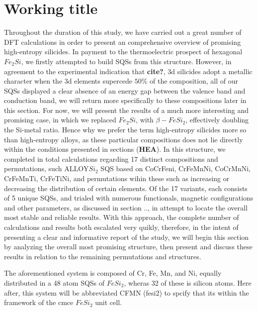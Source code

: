\chapter{Working title}
\label{sec:something}


Throughout the duration of this study, we have carried out a great number of DFT calculations in order to present an comprehensive overview of promising high-entropy silicides. In payment to the thermoelectric prospect of hexagonal $Fe_2Si$, we firstly attempted to build SQSs from this structure. However, in agreement to the experimental indication that \textbf{cite?}, 3d silicides adopt a metallic character when the 3d elements supercede $50\%$ of the composition, all of our SQSs displayed a clear absence of an energy gap between the valence band and conduction band, we will return  more specifically to these compositions later in this section. For now, we will present the results of a much more interesting and promising case, in which we replaced $Fe_2Si$, with $\beta-FeSi_2$, effectively doubling the Si-metal ratio. Hence why we prefer the term high-entropy silicides more so than high-entropy alloys, as these particular compositions does not lie directly within the conditions presented in sections (\textbf{HEA}). In this structure, we completed in total calculations regarding 17 distinct compositions and permutations, such $\text{ALLOY}Si_2$ SQS based on CoCrFeni, CrFeMnNi, CoCrMnNi, CrFeMnTi, CrFeTiNi, and permutations wihin these such as increasing or decreasing the distribution of certain elements. Of the 17 variants, each consists of 5 unique SQSs, and trialed with numerous functionals, magnetic configurations and other parameters, as discussed in section .., in attempt to locate the overall most stable and reliable results. With this approach, the complete number of calculations and results both escalated very quikly, therefore, in the intent of presenting a clear and informative report of the study, we will begin this section by analyzing the overall most promising structure, then present and discuss these results in relation to the remaining permutations and structures.    

The aforementioned system is composed of Cr, Fe, Mn, and Ni, equally distributed in a 48 atom SQSs of $FeSi_2$, wheras 32 of these is silicon atoms. Here after, this system will be abbreviated CFMN (fesi2) to spcify that its within the framework of the cmce $FeSi_2$ unit cell.
 
